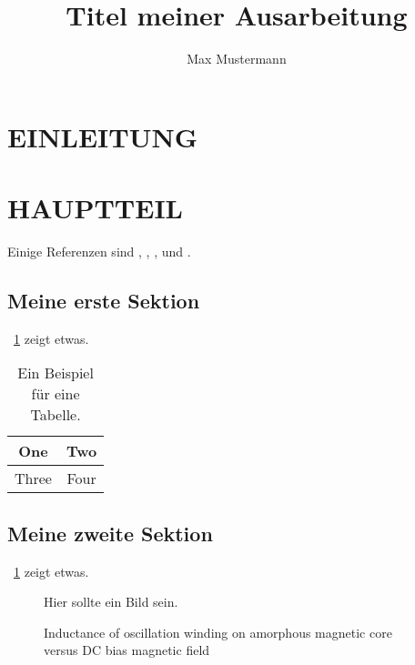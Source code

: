 \documentclass[a4paper, 10pt, conference]{ieeeconf_de}
\title{\LARGE \bf
	Titel meiner Ausarbeitung
}
\author{Max Mustermann}
\begin{document}
\maketitle
\thispagestyle{empty}
\pagestyle{empty}



\begin{abstract}

	

\end{abstract}


\section{EINLEITUNG}


\section{HAUPTTEIL}

Einige Referenzen sind \cite{Hartley03}, \cite{Arulampalam02}, \cite{scherer2010histograms} , \cite{dalal2005histograms} und \cite{Kaestner05}.

\subsection{Meine erste Sektion} 
\tablename~\ref{table_example} zeigt etwas.

\begin{table}
\caption{Ein Beispiel für eine Tabelle.}
\label{table_example}
\begin{center}
\begin{tabular}{|c||c|}
\hline
One & Two\\
\hline
Three & Four\\
\hline
\end{tabular}
\end{center}
\end{table}


\subsection{Meine zweite Sektion}

\figurename~\ref{figurelabel} zeigt etwas.

   \begin{figure}[thpb]
      \centering
			Hier sollte ein Bild sein.
      \caption{Inductance of oscillation winding on amorphous
       magnetic core versus DC bias magnetic field}
      \label{figurelabel}
   \end{figure}
\end{document}
